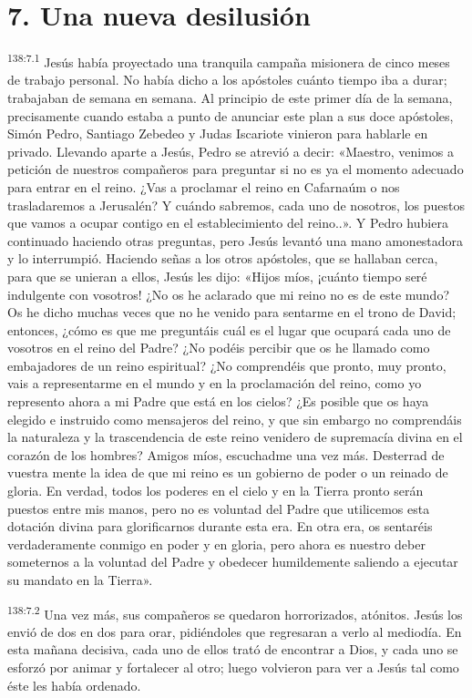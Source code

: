 \section*{7. Una nueva desilusión}
\par
\textsuperscript{138:7.1} Jesús había proyectado una tranquila campaña misionera de cinco meses de trabajo personal. No había dicho a los apóstoles cuánto tiempo iba a durar; trabajaban de semana en semana. Al principio de este primer día de la semana, precisamente cuando estaba a punto de anunciar este plan a sus doce apóstoles, Simón Pedro, Santiago Zebedeo y Judas Iscariote vinieron para hablarle en privado. Llevando aparte a Jesús, Pedro se atrevió a decir: «Maestro, venimos a petición de nuestros compañeros para preguntar si no es ya el momento adecuado para entrar en el reino. ¿Vas a proclamar el reino en Cafarnaúm o nos trasladaremos a Jerusalén? Y cuándo sabremos, cada uno de nosotros, los puestos que vamos a ocupar contigo en el establecimiento del reino..». Y Pedro hubiera continuado haciendo otras preguntas, pero Jesús levantó una mano amonestadora y lo interrumpió. Haciendo señas a los otros apóstoles, que se hallaban cerca, para que se unieran a ellos, Jesús les dijo: «Hijos míos, ¡cuánto tiempo seré indulgente con vosotros! ¿No os he aclarado que mi reino no es de este mundo? Os he dicho muchas veces que no he venido para sentarme en el trono de David; entonces, ¿cómo es que me preguntáis cuál es el lugar que ocupará cada uno de vosotros en el reino del Padre? ¿No podéis percibir que os he llamado como embajadores de un reino espiritual? ¿No comprendéis que pronto, muy pronto, vais a representarme en el mundo y en la proclamación del reino, como yo represento ahora a mi Padre que está en los cielos? ¿Es posible que os haya elegido e instruido como mensajeros del reino, y que sin embargo no comprendáis la naturaleza y la trascendencia de este reino venidero de supremacía divina en el corazón de los hombres? Amigos míos, escuchadme una vez más. Desterrad de vuestra mente la idea de que mi reino es un gobierno de poder o un reinado de gloria. En verdad, todos los poderes en el cielo y en la Tierra pronto serán puestos entre mis manos, pero no es voluntad del Padre que utilicemos esta dotación divina para glorificarnos durante esta era. En otra era, os sentaréis verdaderamente conmigo en poder y en gloria, pero ahora es nuestro deber someternos a la voluntad del Padre y obedecer humildemente saliendo a ejecutar su mandato en la Tierra».

\par
\textsuperscript{138:7.2} Una vez más, sus compañeros se quedaron horrorizados, atónitos. Jesús los envió de dos en dos para orar, pidiéndoles que regresaran a verlo al mediodía. En esta mañana decisiva, cada uno de ellos trató de encontrar a Dios, y cada uno se esforzó por animar y fortalecer al otro; luego volvieron para ver a Jesús tal como éste les había ordenado.

